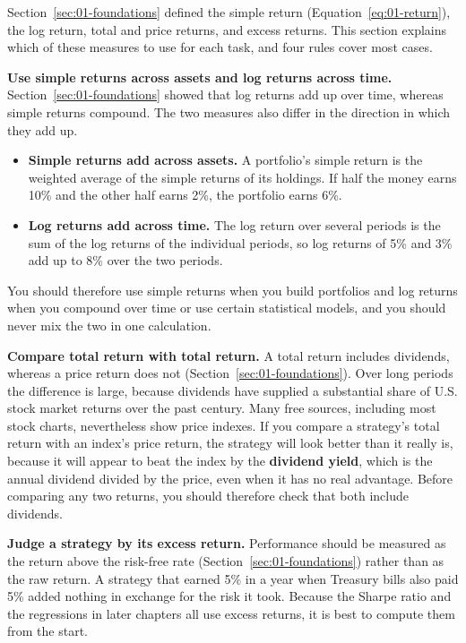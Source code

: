 Section~\ref{sec:01-foundations} defined the simple return (Equation~\eqref{eq:01-return}), the log return, total and price returns, and excess returns. This section explains which of these measures to use for each task, and four rules cover most cases.

\textbf{Use simple returns across assets and log returns across time.} Section~\ref{sec:01-foundations} showed that log returns add up over time, whereas simple returns compound. The two measures also differ in the direction in which they add up.

\begin{itemize}
  \item \textbf{Simple returns add across assets.} A portfolio's simple return is the weighted average of the simple returns of its holdings. If half the money earns 10\% and the other half earns 2\%, the portfolio earns 6\%.
  \item \textbf{Log returns add across time.} The log return over several periods is the sum of the log returns of the individual periods, so log returns of 5\% and 3\% add up to 8\% over the two periods.
\end{itemize}

You should therefore use simple returns when you build portfolios and log returns when you compound over time or use certain statistical models, and you should never mix the two in one calculation.

\textbf{Compare total return with total return.} A total return includes dividends, whereas a price return does not (Section~\ref{sec:01-foundations}). Over long periods the difference is large, because dividends have supplied a substantial share of U.S. stock market returns over the past century. Many free sources, including most stock charts, nevertheless show price indexes. If you compare a strategy's total return with an index's price return, the strategy will look better than it really is, because it will appear to beat the index by the \textbf{dividend yield}, which is the annual dividend divided by the price, even when it has no real advantage. Before comparing any two returns, you should therefore check that both include dividends.

\textbf{Judge a strategy by its excess return.} Performance should be measured as the return above the risk-free rate (Section~\ref{sec:01-foundations}) rather than as the raw return. A strategy that earned 5\% in a year when Treasury bills also paid 5\% added nothing in exchange for the risk it took. Because the Sharpe ratio and the regressions in later chapters all use excess returns, it is best to compute them from the start.

